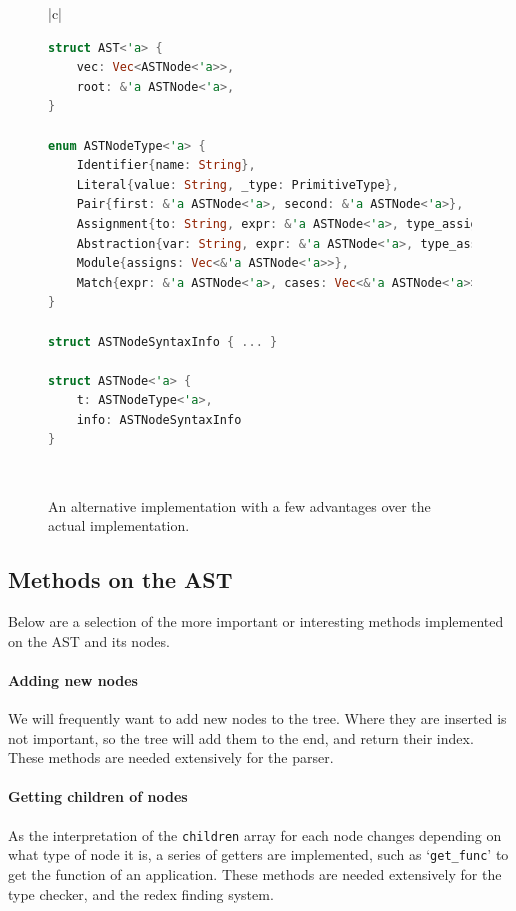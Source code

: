 \begin{figure}[t]
    \centering
    \begin{tabular}{|c|}
        \hline
    \begin{lstlisting}[language=Rust]
struct AST<'a> {
    vec: Vec<ASTNode<'a>>,
    root: &'a ASTNode<'a>,
}

enum ASTNodeType<'a> {
    Identifier{name: String},
    Literal{value: String, _type: PrimitiveType},
    Pair{first: &'a ASTNode<'a>, second: &'a ASTNode<'a>},
    Assignment{to: String, expr: &'a ASTNode<'a>, type_assign: Type},
    Abstraction{var: String, expr: &'a ASTNode<'a>, type_assign: Type},
    Module{assigns: Vec<&'a ASTNode<'a>>},
    Match{expr: &'a ASTNode<'a>, cases: Vec<&'a ASTNode<'a>>}
} 

struct ASTNodeSyntaxInfo { ... }

struct ASTNode<'a> {
    t: ASTNodeType<'a>,
    info: ASTNodeSyntaxInfo
}
    \end{lstlisting}
    \\\hline
    \end{tabular}
    \caption{An alternative implementation with a few advantages over the actual implementation. }
    \label{fig:ast_lst_2}
\end{figure}

\subsection{Methods on the AST}
Below are a selection of the more important or interesting methods implemented on the AST and its nodes.

\paragraph{Adding new nodes} We will frequently want to add new nodes to the tree. Where they are inserted is not important, so the tree will add them to the end, and return their index. These methods are needed extensively for the parser.

\paragraph{Getting children of nodes} As the interpretation of the \verb|children| array for each node changes depending on what type of node it is, a series of getters are implemented, such as `\verb|get_func|' to get the function of an application. These methods are needed extensively for the type checker, and the redex finding system. 

